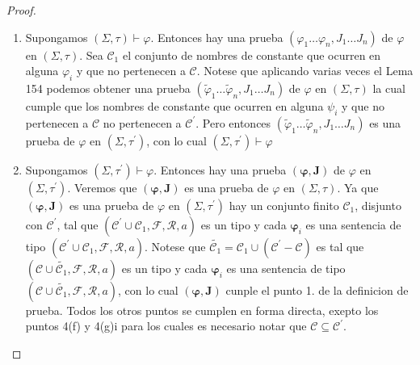   \begin{proof}
    \PN \newline
    \begin{enumerate}[(1)]
      \item Supongamos $(\Sigma, \tau)\vdash \varphi $. Entonces hay una prueba $ (\varphi_{1}\dotsc\varphi_{n},J_{1}\dotsc J_{n})$ de $\varphi$ en $(\Sigma, \tau)$. Sea $\mathcal{C}_{1}$ el conjunto de nombres de constante que ocurren en alguna $\varphi_{i}$ y que no pertenecen a $\mathcal{C}.$ Notese que aplicando varias veces el Lema 154 podemos obtener una prueba $ (\tilde{\varphi}_{1}\dotsc\tilde{\varphi}_{n},J_{1}\dotsc J_{n})$ de $\varphi$ en $(\Sigma, \tau)$ la cual cumple que los nombres de constante que ocurren en alguna $\psi_{i}$ y que no pertenecen a $\mathcal{C}$ no pertenecen a $ \mathcal{C}^{\prime}$. Pero entonces $(\tilde{\varphi}_{1}\dotsc\tilde{\varphi} _{n},J_{1}\dotsc J_{n})$ es una prueba de $\varphi$ en $(\Sigma ,\tau ^{\prime})$, con lo cual $(\Sigma ,\tau ^{\prime})\vdash \varphi $

      \item Supongamos $(\Sigma ,\tau ^{\prime})\vdash \varphi $. Entonces hay una prueba $(\mathbf{\varphi },\mathbf{J})$ de $\varphi$ en $(\Sigma ,\tau ^{\prime})$. Veremos que $(\mathbf{\varphi },\mathbf{J})$ es una prueba de $\varphi$ en $(\Sigma, \tau)$. Ya que $(\mathbf{\varphi },\mathbf{J})$ es una prueba de $\varphi$ en $(\Sigma ,\tau ^{\prime})$ hay un conjunto finito $\mathcal{C}_{1}$, disjunto con $\mathcal{C}^{\prime}$, tal que $( \mathcal{C}^{\prime}\cup \mathcal{C}_{1},\mathcal{F},\mathcal{R},a)$ es un tipo y cada $\mathbf{\varphi }_{i}$ es una sentencia de tipo $(\mathcal{C} ^{\prime}\cup \mathcal{C}_{1},\mathcal{F},\mathcal{R},a)$. Notese que $ \widetilde{\mathcal{C}_{1}}=\mathcal{C}_{1}\cup (\mathcal{C}^{\prime}- \mathcal{C})$ es tal que $(\mathcal{C}\cup \widetilde{\mathcal{C}_{1}}, \mathcal{F},\mathcal{R},a)$ es un tipo y cada $\mathbf{\varphi }_{i}$ es una sentencia de tipo $(\mathcal{C}\cup \widetilde{\mathcal{C}_{1}},\mathcal{F}, \mathcal{R},a)$, con lo cual $(\mathbf{\varphi },\mathbf{J})$ cunple el punto 1. de la definicion de prueba. Todos los otros puntos se cumplen en forma directa, exepto los puntos 4(f) y 4(g)i para los cuales es necesario notar que $\mathcal{C}\subseteq \mathcal{C}^{\prime}$.
    \end{enumerate}
  \end{proof}

